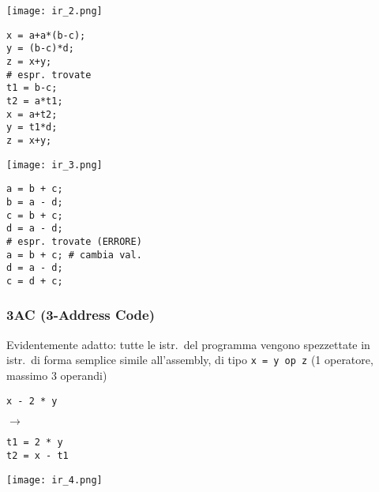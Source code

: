 \begin{example}[frametitle={Esempi}]
   \noindent\begin{minipage}[c]{.18\textwidth}
   \texttt{[image: ir\_2.png]}
   \end{minipage}
   \begin{minipage}[c]{.23\textwidth}
      \begin{lstlisting}
x = a+a*(b-c);
y = (b-c)*d;
z = x+y;
# espr. trovate
t1 = b-c;
t2 = a*t1;
x = a+t2;
y = t1*d;
z = x+y;\end{lstlisting}
   \end{minipage}\hfill\vline\hfill
   \begin{minipage}[c]{.18\textwidth}
   \texttt{[image: ir\_3.png]}
   \end{minipage}
   \begin{minipage}[c]{.35\textwidth}
      \begin{lstlisting}
a = b + c;
b = a - d;
c = b + c;
d = a - d;
# espr. trovate (ERRORE)
a = b + c; # cambia val.
d = a - d;
c = d + c;\end{lstlisting}
   \end{minipage}
\end{example}



\subsubsection{3AC (3-Address Code)}

\begin{minipage}[c]{.65\textwidth}
Evidentemente adatto: tutte le istr.~del programma vengono spezzettate in istr.~di forma semplice simile all'assembly, di tipo \lstinline|x = y op z| (1 operatore, massimo 3 operandi)

\noindent\hfill
  \begin{minipage}[c]{.3\textwidth}
    \begin{lstlisting}
x - 2 * y\end{lstlisting}
  \end{minipage}\hfill
  $\rightarrow$\hfill
  \begin{minipage}[c]{.32\textwidth}
    \begin{lstlisting}
t1 = 2 * y
t2 = x - t1\end{lstlisting}
  \end{minipage}\hfill
\end{minipage}
  \hfill
  \begin{minipage}[c]{.3\textwidth}
  \texttt{[image: ir\_4.png]}
  \end{minipage}

